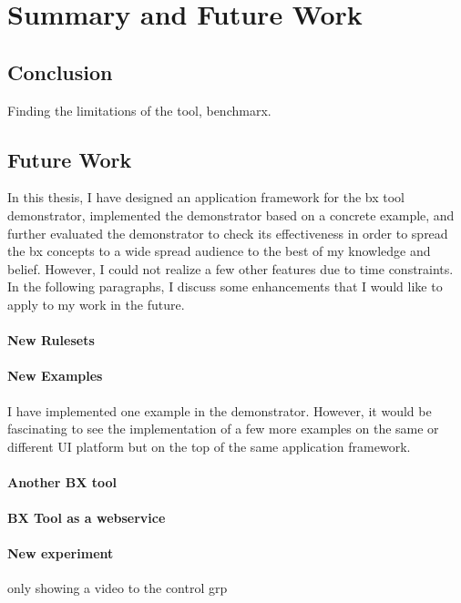 \section{Summary and Future Work}\label{sec:timeplan}
\subsection{Conclusion}\label{subsec:conclusion}
Finding the limitations of the tool, benchmarx.
\subsection{Future Work}\label{subsec:futurework}
In this thesis, I have designed an application framework for the bx tool demonstrator, implemented the demonstrator based on a concrete example, and further evaluated the demonstrator to check its effectiveness in order to spread the bx concepts to a wide spread audience to the best of my knowledge and belief. However, I could not realize a few other features due to time constraints. In the following paragraphs, I discuss some enhancements that I would like to apply to my work in the future. 
\paragraph{New Rulesets}
\paragraph{New Examples} I have implemented one example in the demonstrator. However, it would be fascinating to see the implementation of a few more examples on the same or different UI platform but on the top of the same application framework.
\paragraph{Another BX tool}
\paragraph{BX Tool as a webservice}
\paragraph{New experiment}
only showing a video to the control grp




